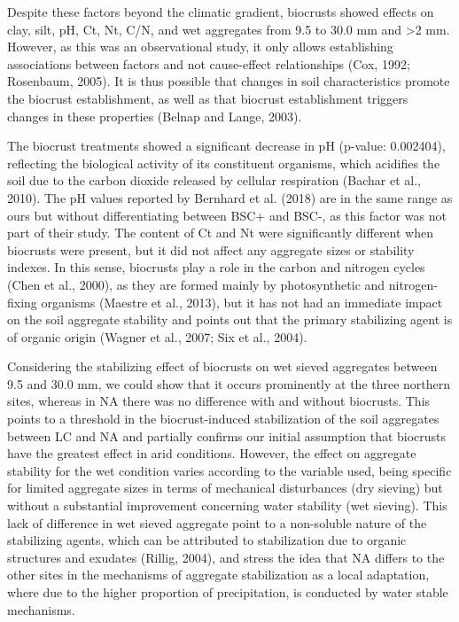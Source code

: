 Despite these factors beyond the climatic gradient, biocrusts showed effects on clay, silt, pH, Ct, Nt, C/N, and wet aggregates from 9.5 to 30.0 mm and >2 mm. However, as this was an observational study, it only allows establishing associations between factors and not cause-effect relationships (Cox, 1992; Rosenbaum, 2005). It is thus possible that changes in soil characteristics promote the biocrust establishment, as well as that biocrust establishment triggers changes in these properties (Belnap and Lange, 2003).

The biocrust treatments showed a significant decrease in pH (p-value: 0.002404), reflecting the biological activity of its constituent organisms, which acidifies the soil due to the carbon dioxide released by cellular respiration (Bachar et al., 2010). The pH values reported by Bernhard et al. (2018) are in the same range as ours but without differentiating between BSC+ and BSC-, as this factor was not part of their study. The content of Ct and Nt were significantly different when biocrusts were present, but it did not affect any aggregate sizes or stability indexes. In this sense, biocrusts play a role in the carbon and nitrogen cycles (Chen et al., 2000), as they are formed mainly by photosynthetic and nitrogen-fixing organisms (Maestre et al., 2013), but it has not had an immediate impact on the soil aggregate stability and points out that the primary stabilizing agent is of organic origin (Wagner et al., 2007; Six et al., 2004).

Considering the stabilizing effect of biocrusts on wet sieved aggregates between 9.5 and 30.0 mm, we could show that it occurs prominently at the three northern sites, whereas in NA there was no difference with and without biocrusts. This points to a threshold in the biocrust-induced stabilization of the soil aggregates between LC and NA and partially confirms our initial assumption that biocrusts have the greatest effect in arid conditions. However, the effect on aggregate stability for the wet condition varies according to the variable used, being specific for limited aggregate sizes in terms of mechanical disturbances (dry sieving) but without a substantial improvement concerning water stability (wet sieving). This lack of difference in wet sieved aggregate point to a non-soluble nature of the stabilizing agents, which can be attributed to stabilization due to organic structures and exudates (Rillig, 2004), and stress the idea that NA differs to the other sites in the mechanisms of aggregate stabilization as a local adaptation, where due to the higher proportion of precipitation, is conducted by water stable mechanisms.

